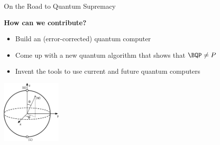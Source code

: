 




\begin{frame}{On the Road to Quantum Supremacy}



	\begin{block}{\bf How can we contribute?}
		\begin{itemize}
		\item Build an (error-corrected) quantum computer
		\item<+-> Come up with a new quantum algorithm that shows that $\BQP \neq P$
		\item<+-> \alert{Invent the tools to use current and future quantum computers}
		\end{itemize}
	\end{block}

\centering
\includegraphics[width=3cm]{graphics/Bloch_sphere.svg.png}


\end{frame}








